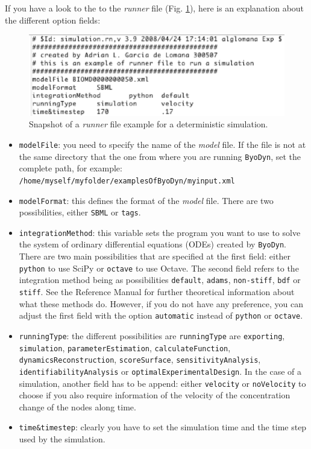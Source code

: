 \documentclass[a4paper, 11pt]{article}
\begin{document}
  If you have a look to the to the \emph{runner} file (Fig. \ref{simulationRunner}), here is an explanation about the different option fields:
  \begin{figure}[ht!]
    \begin{center}
      \includegraphics[scale=.75]{figures/simulationRunner.eps}
      \caption{
        Snapshot of a \emph{runner} file example for a deterministic simulation.
      }
      \label{simulationRunner}
    \end{center}
  \end{figure}
  \begin{itemize}
    \item
      \texttt{modelFile}: you need to specify the name of the \emph{model} file.
      If the file is not at the same directory that the one from where you are running \texttt{ByoDyn}, set the complete path, for example:\\
      \texttt{/home/myself/myfolder/examplesOfByoDyn/myinput.xml}
    \item
      \texttt{modelFormat}: this defines the format of the \emph{model} file.
      There are two possibilities, either \texttt{SBML} or \texttt{tags}.
    \item
      \texttt{integrationMethod}: this variable sets the program you want to use to solve the system of ordinary differential equations (ODEs) created by \texttt{ByoDyn}. There are two main possibilities that are specified at the first field: either \texttt{python} to use SciPy or \texttt{octave} to use Octave. The second field refers to the integration method being as possibilities \texttt{default}, \texttt{adams}, \texttt{non-stiff}, \texttt{bdf} or \texttt{stiff}. See the Reference Manual for further theoretical information about what these methods do. However, if you do not have any preference, you can adjust the first field with the option \texttt{automatic} instead of \texttt{python} or \texttt{octave}.
    \item
      \texttt{runningType}: the different possibilities are \texttt{runningType} are \texttt{exporting}, \texttt{simulation}, \texttt{parameterEstimation}, \texttt{calculateFunction}, \texttt{dynamicsReconstruction}, \texttt{scoreSurface}, \texttt{sensitivityAnalysis}, \texttt{identifiabilityAnalysis} or \texttt{optimalExperimentalDesign}.  
      In the case of a simulation, another field has to be append: either \texttt{velocity} or \texttt{noVelocity} to choose if you also require information of the velocity of the concentration change of the nodes along time.
    \item
      \texttt{time\&timestep}: clearly you have to set the simulation time and the time step used by the simulation.
  \end{itemize}
\end{document}

